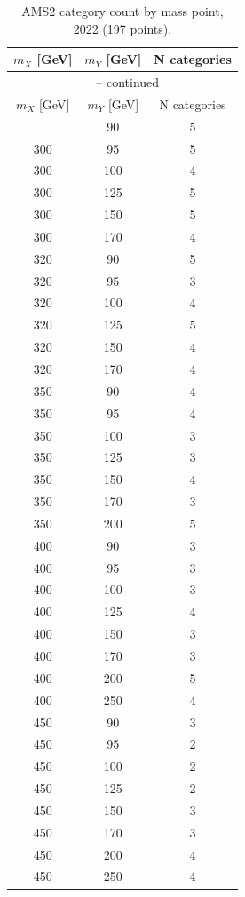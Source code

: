 
\begin{longtable}{c c c}
\caption{AMS2 category count by mass point, 2022 (197 points).}
\label{tab:category_count_2022} \\
\hline
$m_X$ [GeV] & $m_Y$ [GeV] & N categories \\
\hline
\endfirsthead
\multicolumn{3}{c}{\tablename\ \thetable{} -- continued} \\
\hline
$m_X$ [GeV] & $m_Y$ [GeV] & N categories \\
\hline
\endhead
\hline
\endfoot
\hline
\endlastfoot
300 & 90 & 5 \\
300 & 95 & 5 \\
300 & 100 & 4 \\
300 & 125 & 5 \\
300 & 150 & 5 \\
300 & 170 & 4 \\
320 & 90 & 5 \\
320 & 95 & 3 \\
320 & 100 & 4 \\
320 & 125 & 5 \\
320 & 150 & 4 \\
320 & 170 & 4 \\
350 & 90 & 4 \\
350 & 95 & 4 \\
350 & 100 & 3 \\
350 & 125 & 3 \\
350 & 150 & 4 \\
350 & 170 & 3 \\
350 & 200 & 5 \\
400 & 90 & 3 \\
400 & 95 & 3 \\
400 & 100 & 3 \\
400 & 125 & 4 \\
400 & 150 & 3 \\
400 & 170 & 3 \\
400 & 200 & 5 \\
400 & 250 & 4 \\
450 & 90 & 3 \\
450 & 95 & 2 \\
450 & 100 & 2 \\
450 & 125 & 2 \\
450 & 150 & 3 \\
450 & 170 & 3 \\
450 & 200 & 4 \\
450 & 250 & 4 \\

\end{longtable}
